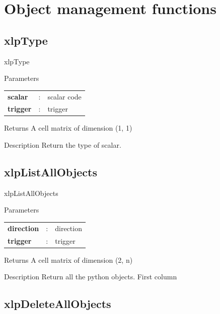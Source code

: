 \section{Object management functions}


\subsection{xlpType}

\begin{xlpfunctitle}{xlpType}

\begin{xlpfunc}{Parameters}
\begin{tabular}{p{3.5cm}cl}
\textbf{scalar}& : & scalar code \\
\textbf{trigger}& : & trigger 
\end{tabular}
\end{xlpfunc}


\begin{xlpfunc}{Returns}
A cell matrix of dimension (1, 1)
\end{xlpfunc}

\begin{xlpfunc}{Description}
Return the type of scalar. 
\end{xlpfunc}


\subsection{xlpListAllObjects}

\begin{xlpfunctitle}{xlpListAllObjects}

\begin{xlpfunc}{Parameters}
\begin{tabular}{p{3.5cm}cl}
\textbf{direction}& : & direction \\
\textbf{trigger}& : & trigger 
\end{tabular}
\end{xlpfunc}


\begin{xlpfunc}{Returns}
A cell matrix of dimension (2, n)
\end{xlpfunc}

\begin{xlpfunc}{Description}
Return all the python objects. First column
\end{xlpfunc}


\subsection{xlpDeleteAllObjects}


\end{xlpfunctitle}
\end{xlpfunctitle}
